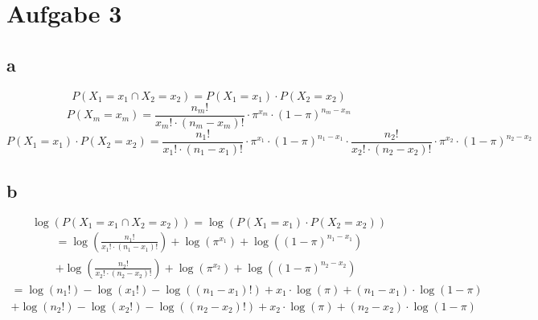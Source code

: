 

\section{Aufgabe 3}
\subsection{a}
\[ P(X_1=x_1 \cap X_2 = x_2) = P(X_1=x_1) \cdot P(X_2=x_2) \]
\[ P(X_m=x_m) = \frac{n_m!}{x_m! \cdot (n_m - x_m)!} 
\cdot \pi^{x_m} \cdot (1-\pi)^{n_m - x_m} \]
\[ P(X_1=x_1) \cdot P(X_2=x_2) 
= \frac{n_1!}{x_1! \cdot (n_1 - x_1)!} 
\cdot \pi^{x_1} \cdot (1-\pi)^{n_1 - x_1} 
\cdot \frac{n_2!}{x_2! \cdot (n_2 - x_2)!} 
\cdot \pi^{x_2} \cdot (1-\pi)^{n_2 - x_2} \]

\subsection{b}
\[ \log(P(X_1=x_1 \cap X_2 = x_2)) = \log(P(X_1=x_1) \cdot P(X_2=x_2)) \]
\[ \begin{array}{l} 
= \log\left(\frac{n_1!}{x_1! \cdot (n_1 - x_1)!}\right) 
+ \log(\pi^{x_1}) 
+ \log((1-\pi)^{n_1 - x_1})\\ 
+ \log\left(\frac{n_2!}{x_2! \cdot (n_2 - x_2)!}\right) 
+ \log(\pi^{x_2}) 
+ \log((1-\pi)^{n_2 - x_2}) 
\end{array} \]
% 
\[ \begin{array}{l} 
= \log(n_1!) 
- \log(x_1!) 
- \log((n_1 - x_1)!) 
+ x_1 \cdot \log(\pi) 
+ (n_1 - x_1) \cdot \log(1-\pi) \\
+ \log(n_2!) 
- \log(x_2!) 
- \log((n_2 - x_2)!) 
+ x_2 \cdot \log(\pi) 
+ (n_2 - x_2) \cdot \log(1-\pi) 
\end{array} \]

